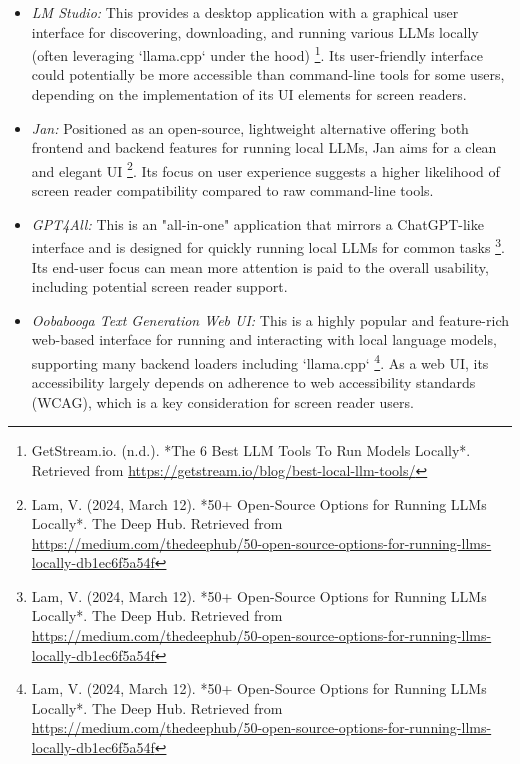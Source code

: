 \begin{itemize}
    \item \emph{LM Studio:} This provides a desktop application with a graphical user interface for discovering, downloading, and running various LLMs locally (often leveraging `llama.cpp` under the hood) \footnote{GetStream.io. (n.d.). *The 6 Best LLM Tools To Run Models Locally*. Retrieved from \url{https://getstream.io/blog/best-local-llm-tools/}}. Its user-friendly interface could potentially be more accessible than command-line tools for some users, depending on the implementation of its UI elements for screen readers.
    \item \emph{Jan:} Positioned as an open-source, lightweight alternative offering both frontend and backend features for running local LLMs, Jan aims for a clean and elegant UI \footnote{Lam, V. (2024, March 12). *50+ Open-Source Options for Running LLMs Locally*. The Deep Hub. Retrieved from \url{https://medium.com/thedeephub/50-open-source-options-for-running-llms-locally-db1ec6f5a54f}}. Its focus on user experience suggests a higher likelihood of screen reader compatibility compared to raw command-line tools.
    \item \emph{GPT4All:} This is an "all-in-one" application that mirrors a ChatGPT-like interface and is designed for quickly running local LLMs for common tasks \footnote{Lam, V. (2024, March 12). *50+ Open-Source Options for Running LLMs Locally*. The Deep Hub. Retrieved from \url{https://medium.com/thedeephub/50-open-source-options-for-running-llms-locally-db1ec6f5a54f}}. Its end-user focus can mean more attention is paid to the overall usability, including potential screen reader support.
    \item \emph{Oobabooga Text Generation Web UI:} This is a highly popular and feature-rich web-based interface for running and interacting with local language models, supporting many backend loaders including `llama.cpp` \footnote{Lam, V. (2024, March 12). *50+ Open-Source Options for Running LLMs Locally*. The Deep Hub. Retrieved from \url{https://medium.com/thedeephub/50-open-source-options-for-running-llms-locally-db1ec6f5a54f}}. As a web UI, its accessibility largely depends on adherence to web accessibility standards (WCAG), which is a key consideration for screen reader users.
\end{itemize}


